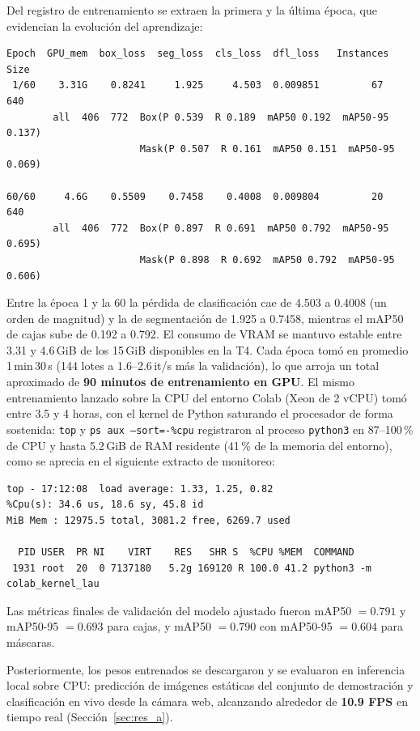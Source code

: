 Del registro de entrenamiento se extraen la primera y la última época, que
evidencian la evolución del aprendizaje:

\begin{lstlisting}[style=code]
Epoch  GPU_mem  box_loss  seg_loss  cls_loss  dfl_loss   Instances  Size
 1/60    3.31G    0.8241     1.925     4.503  0.009851         67   640
        all  406  772  Box(P 0.539  R 0.189  mAP50 0.192  mAP50-95 0.137)
                       Mask(P 0.507  R 0.161  mAP50 0.151  mAP50-95 0.069)

60/60     4.6G    0.5509    0.7458    0.4008  0.009804         20   640
        all  406  772  Box(P 0.897  R 0.691  mAP50 0.792  mAP50-95 0.695)
                       Mask(P 0.898  R 0.692  mAP50 0.792  mAP50-95 0.606)
\end{lstlisting}

Entre la época 1 y la 60 la pérdida de clasificación cae de 4.503 a 0.4008
(un orden de magnitud) y la de segmentación de 1.925 a 0.7458, mientras el
mAP50 de cajas sube de 0.192 a 0.792. El consumo de VRAM se mantuvo estable
entre 3.31 y 4.6\,GiB de los 15\,GiB disponibles en la T4. Cada época tomó en
promedio 1\,min\,30\,s (144 lotes a 1.6--2.6\,it/s más la validación), lo que
arroja un total aproximado de \textbf{90 minutos de entrenamiento en GPU}. El
mismo entrenamiento lanzado sobre la CPU del entorno Colab (Xeon de 2 vCPU)
tomó entre 3.5 y 4 horas, con el kernel de Python saturando el procesador de
forma sostenida: \texttt{top} y \texttt{ps aux --sort=-\%cpu} registraron al
proceso \texttt{python3} en 87--100\,\% de CPU y hasta 5.2\,GiB de RAM
residente (41\,\% de la memoria del entorno), como se aprecia en el siguiente
extracto de monitoreo:

\begin{lstlisting}[style=code]
top - 17:12:08  load average: 1.33, 1.25, 0.82
%Cpu(s): 34.6 us, 18.6 sy, 45.8 id
MiB Mem : 12975.5 total, 3081.2 free, 6269.7 used

  PID USER  PR NI    VIRT    RES   SHR S  %CPU %MEM  COMMAND
 1931 root  20  0 7137180   5.2g 169120 R 100.0 41.2 python3 -m colab_kernel_lau
\end{lstlisting}

Las métricas finales de validación del modelo ajustado fueron
mAP50 $= 0.791$ y mAP50-95 $= 0.693$ para cajas, y mAP50 $= 0.790$ con
mAP50-95 $= 0.604$ para máscaras.

Posteriormente, los pesos entrenados se descargaron y se evaluaron en
inferencia local sobre CPU: predicción de imágenes estáticas del conjunto de
demostración y clasificación en vivo desde la cámara web, alcanzando alrededor
de \textbf{10.9 FPS} en tiempo real (Sección~\ref{sec:res_a}).


